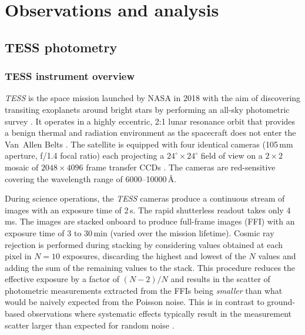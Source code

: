 \documentclass[twocolumn]{aastex631}
\begin{document}
\section{Observations and analysis}
\label{sec:obs}

\subsection{TESS photometry}
\label{sec:tessobs}

\subsubsection{TESS instrument overview}
\label{sec:tessintro}

{\em TESS} %
is the space mission launched by NASA in 2018 with the aim of discovering transiting
exoplanets around bright stars by performing an all-sky photometric survey \citep{2015JATIS...1a4003R}.
It operates in a highly eccentric, 2:1 lunar resonance orbit that
provides a benign thermal and radiation environment 
as the spacecraft does not enter the Van~Allen Belts \citep{2013arXiv1306.5333G}.
The satellite is equipped with four identical cameras 
(105\,mm aperture, f/1.4 focal ratio) each projecting 
a $24^\circ \times 24^\circ$ field of view on a $2\times2$ 
mosaic of $2048 \times 4096$ frame transfer CCDs %
\citep{2019AcAau.160...46K}. The cameras are red-sensitive covering 
the wavelength range of 6000--10000\,\AA.

During science operations, the {\em TESS} cameras produce a continuous stream 
of images with an exposure time of 2\,s. The rapid shutterless 
readout %
takes only 4\,ms.
The images are stacked onboard to produce full-frame images
(FFI) with an exposure time of 3 to 30\,min (varied over the mission lifetime). 
Cosmic ray rejection is performed during stacking by considering
values obtained at each pixel in $N=10$ exposures, discarding the highest
and lowest of the $N$ values and adding the sum of the remaining values to
the stack. This procedure reduces the effective exposure by a factor of $(N-2)/N$
\citep{tesshandbook} 
and results in the scatter of photometric measurements extracted from the FFIs being 
{\it smaller} than what would be naively expected from the Poisson noise. 
This is in contrast to ground-based observations where systematic effects
typically result in the measurement scatter larger than expected for 
random noise \citep[e.g.,][]{2016AcA....66....1S}.
\end{document}
